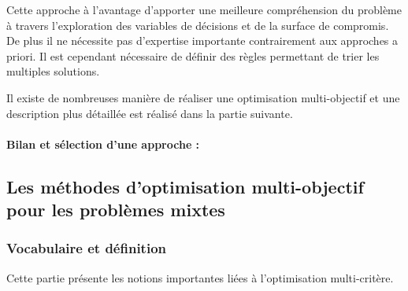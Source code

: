 
Cette approche à l’avantage d’apporter une meilleure compréhension du problème à
travers l’exploration des variables de décisions et de la surface de compromis.
De plus il ne nécessite pas d’expertise importante contrairement aux approches a priori.
Il est cependant nécessaire de définir des règles permettant de trier les multiples solutions.

Il existe de nombreuses manière de réaliser une optimisation multi-objectif et une
description plus détaillée est réalisé dans la partie suivante.

\paragraph{Bilan et sélection d’une approche :} %
\label{par:bilan_et_selection_d_une_approche}



\subsection{Les méthodes d’optimisation multi-objectif pour les problèmes mixtes} %
\label{sub:les_methodes_d_optimisation_multi_objectif_pour_les_probleme_mixtes}
\subsubsection{Vocabulaire et définition} %
\label{ssub:vocabulaire_et_definition}
Cette partie présente les notions importantes liées à l’optimisation multi-critère.
